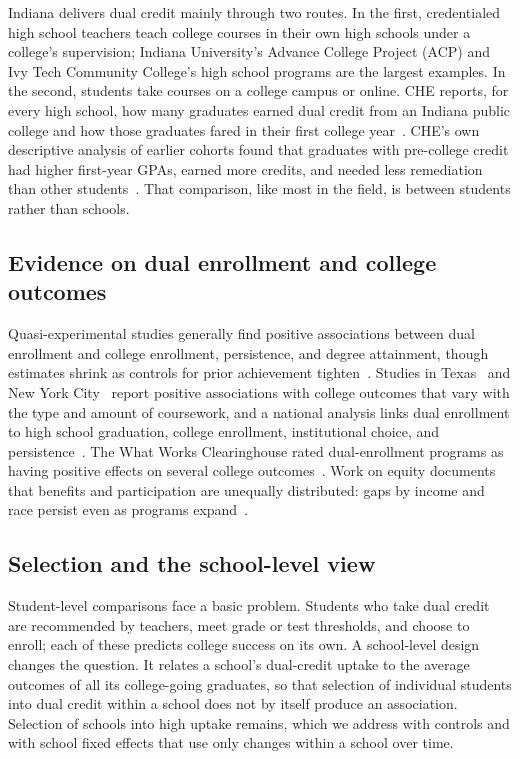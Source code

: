 \documentclass[aps,prd,reprint,superscriptaddress,nofootinbib,floatfix]{revtex4-2}
\begin{document}
Indiana delivers dual credit mainly through two routes. In the first, credentialed high school teachers teach college courses in their own high schools under a college's supervision; Indiana University's Advance College Project (ACP) and Ivy Tech Community College's high school programs are the largest examples. In the second, students take courses on a college campus or online. CHE reports, for every high school, how many graduates earned dual credit from an Indiana public college and how those graduates fared in their first college year~\cite{chedata}. CHE's own descriptive analysis of earlier cohorts found that graduates with pre-college credit had higher first-year GPAs, earned more credits, and needed less remediation than other students~\cite{che2016}. That comparison, like most in the field, is between students rather than schools.

\subsection{Evidence on dual enrollment and college outcomes}

Quasi-experimental studies generally find positive associations between dual enrollment and college enrollment, persistence, and degree attainment, though estimates shrink as controls for prior achievement tighten~\cite{an2013,karp2007,speroni2011}. Studies in Texas~\cite{giani2014,miller2017} and New York City~\cite{allen2012} report positive associations with college outcomes that vary with the type and amount of coursework, and a national analysis links dual enrollment to high school graduation, college enrollment, institutional choice, and persistence~\cite{lee2022}. The What Works Clearinghouse rated dual-enrollment programs as having positive effects on several college outcomes~\cite{wwc2017}. Work on equity documents that benefits and participation are unequally distributed: gaps by income and race persist even as programs expand~\cite{taylor2015,fink2017}.

\subsection{Selection and the school-level view}

Student-level comparisons face a basic problem. Students who take dual credit are recommended by teachers, meet grade or test thresholds, and choose to enroll; each of these predicts college success on its own. A school-level design changes the question. It relates a school's dual-credit uptake to the average outcomes of all its college-going graduates, so that selection of individual students into dual credit within a school does not by itself produce an association. Selection of schools into high uptake remains, which we address with controls and with school fixed effects that use only changes within a school over time.
\end{document}
